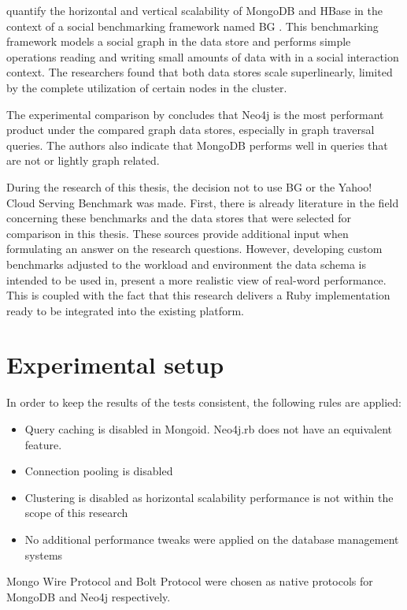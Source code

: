 \textcite{Barahmand2015} quantify the horizontal and vertical scalability of MongoDB and HBase in the context of a social benchmarking framework named BG \autocite{Barahmand2013}.
This benchmarking framework models a social graph in the data store and performs simple operations reading and writing small amounts of data with in a social interaction context.
The researchers found that both data stores scale superlinearly, limited by the complete utilization of certain nodes in the cluster.

The experimental comparison by \textcite{Kolomivcenko2013} concludes that Neo4j is the most performant product under the compared graph data stores, especially in graph traversal queries.
The authors also indicate that MongoDB performs well in queries that are not or lightly graph related.

During the research of this thesis, the decision not to use BG or the Yahoo! Cloud Serving Benchmark was made.
First, there is already literature in the field concerning these benchmarks and the data stores that were selected for comparison in this thesis.
These sources provide additional input when formulating an answer on the research questions.
However, developing custom benchmarks adjusted to the workload and environment the data schema is intended to be used in, present a more realistic view of real-word performance.
This is coupled with the fact that this research delivers a Ruby implementation ready to be integrated into the existing platform.

\section{Experimental setup}
\label{sec:experimental-setup}

In order to keep the results of the tests consistent, the following rules are applied:

\begin{itemize}
  \item Query caching is disabled in Mongoid. Neo4j.rb does not have an equivalent feature.
  \item Connection pooling is disabled
  \item Clustering is disabled as horizontal scalability performance is not within the scope of this research
  \item No additional performance tweaks were applied on the database management systems
\end{itemize}

Mongo Wire Protocol and Bolt Protocol were chosen as native protocols for MongoDB and Neo4j respectively.

